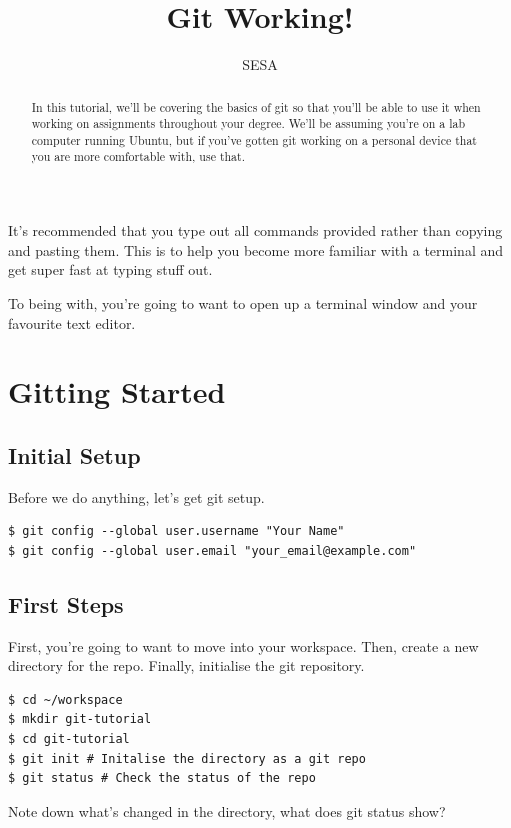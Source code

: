 \documentclass{tufte-handout}
\title{Git Working!}
\author{SESA}
\begin{document}
\maketitle

\begin{abstract}
\noindent In this tutorial, we'll be covering the basics of git so that you'll
be able to use it when working on assignments throughout your degree. We'll be
assuming you're on a lab computer running Ubuntu, but if you've gotten git 
working on a personal device that you are more comfortable with, use that.

\end{abstract}

\noindent It's recommended that you type out all commands provided rather than copying
and pasting them. This is to help you become more familiar with a terminal and
get super fast at typing stuff out.

\noindent To being with, you're going to want to open up a terminal window and your
favourite text editor.

\section{Gitting Started}
\subsection{Initial Setup}

Before we do anything, let's get git setup.

\begin{lstlisting}
$ git config --global user.username "Your Name"
$ git config --global user.email "your_email@example.com"
\end{lstlisting}

\subsection{First Steps}

First, you're going to want to move into your workspace. Then, create a new 
directory for the repo. Finally, initialise the git repository.

\begin{lstlisting}
$ cd ~/workspace
$ mkdir git-tutorial
$ cd git-tutorial
$ git init # Initalise the directory as a git repo
$ git status # Check the status of the repo
\end{lstlisting}

\noindent Note down what's changed in the directory, what does git status show?
\end{document}
